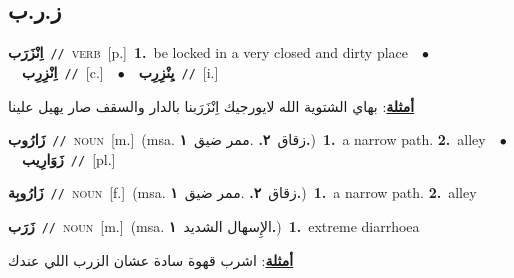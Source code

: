 \documentclass[10pt,a4paper,twoside]{article} %
\begin{document}
\begin{multicols}{2}
\vspace{-3mm}
\subsection*{\color{blue}\foreignlanguage{arabic}{ز.ر.ب}\color{blue}{}} 

{\setlength\topsep{0pt}\textbf{\foreignlanguage{arabic}{اِنْزَرَب}}\ {\color{gray}\texttt{//}\color{black}}\ \textsc{verb}\ [p.]\ \textbf{1.}~be locked in a very closed and dirty place\ \ $\bullet$\ \ \setlength\topsep{0pt}\textbf{\foreignlanguage{arabic}{اِنْزِرِب}}\ {\color{gray}\texttt{//}\color{black}}\ [c.]\ \ $\bullet$\ \ \setlength\topsep{0pt}\textbf{\foreignlanguage{arabic}{يِنْزِرِب}}\ {\color{gray}\texttt{//}\color{black}}\ [i.]\  \begin{flushright}\color{gray}\foreignlanguage{arabic}{\textbf{\underline{\foreignlanguage{arabic}{أمثلة}}}: بهاي الشتوية الله لايورجيك اِنْزَرَبنا بالدار والسقف صار يهيل علينا}\end{flushright}\color{black}} \vspace{2mm}

{\setlength\topsep{0pt}\textbf{\foreignlanguage{arabic}{زَارُوب}}\ {\color{gray}\texttt{//}\color{black}}\ \textsc{noun}\ [m.]\ \color{gray}(msa. \foreignlanguage{arabic}{زقاق}~\foreignlanguage{arabic}{\textbf{٢.}}  .\foreignlanguage{arabic}{ممر ضيق}~\foreignlanguage{arabic}{\textbf{١.}})\color{black}\ \textbf{1.}~a narrow path.  \textbf{2.}~alley\ \ $\bullet$\ \ \setlength\topsep{0pt}\textbf{\foreignlanguage{arabic}{زَوَارِيب}}\ {\color{gray}\texttt{//}\color{black}}\ [pl.]\ } \vspace{2mm}

{\setlength\topsep{0pt}\textbf{\foreignlanguage{arabic}{زَارُوبِة}}\ {\color{gray}\texttt{//}\color{black}}\ \textsc{noun}\ [f.]\ \color{gray}(msa. \foreignlanguage{arabic}{زقاق}~\foreignlanguage{arabic}{\textbf{٢.}}  .\foreignlanguage{arabic}{ممر ضيق}~\foreignlanguage{arabic}{\textbf{١.}})\color{black}\ \textbf{1.}~a narrow path.  \textbf{2.}~alley\ } \vspace{2mm}

{\setlength\topsep{0pt}\textbf{\foreignlanguage{arabic}{زَرَب}}\ {\color{gray}\texttt{//}\color{black}}\ \textsc{noun}\ [m.]\ \color{gray}(msa. \foreignlanguage{arabic}{الإِسهال الشديد}~\foreignlanguage{arabic}{\textbf{١.}})\color{black}\ \textbf{1.}~extreme diarrhoea\  \begin{flushright}\color{gray}\foreignlanguage{arabic}{\textbf{\underline{\foreignlanguage{arabic}{أمثلة}}}: اشرب قهوة سادة عشان الزرب اللي عندك}\end{flushright}\color{black}} \vspace{2mm}


\end{multicols}
\end{document}
